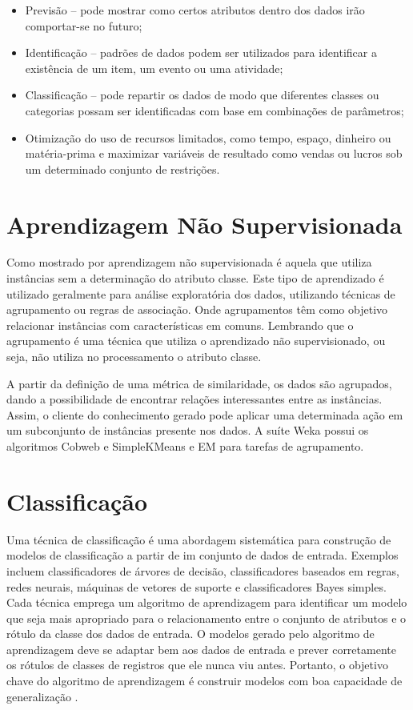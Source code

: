 \documentclass[
	12pt,				%
	openright,			%
	oneside,	
	a4paper,				%
	english,				%
	brazil				%
]{abntex2/abntex2} %
\begin{document}
		\begin{itemize}
			\item Previsão – pode mostrar como certos atributos dentro dos dados irão comportar-se no futuro;
			\item Identificação – padrões de dados podem ser utilizados para identificar a existência de um item, um evento ou uma atividade;
			\item Classificação – pode repartir os dados de modo que diferentes classes ou categorias possam ser identificadas com base em combinações de parâmetros;
			\item Otimização do uso de recursos limitados, como tempo, espaço, dinheiro ou matéria-prima e maximizar variáveis de resultado como vendas ou lucros sob um determinado conjunto de restrições.
		\end{itemize}
		
	\section{Aprendizagem Não Supervisionada}
	
		Como mostrado por \cite{damasceno:2005} aprendizagem não supervisionada é aquela que utiliza instâncias sem a determinação do atributo classe. Este  tipo de aprendizado é utilizado geralmente para análise exploratória dos dados, utilizando técnicas de  agrupamento ou regras de associação. Onde agrupamentos têm como objetivo relacionar instâncias com características em comuns. Lembrando que o agrupamento é uma técnica que utiliza o aprendizado não supervisionado, ou seja, não utiliza no  processamento o atributo classe.
		
		A partir da definição de uma métrica de similaridade, os dados são  agrupados, dando a possibilidade de encontrar relações interessantes entre as instâncias. Assim, o cliente do conhecimento gerado pode aplicar uma determinada ação em um subconjunto de instâncias presente nos  dados. A suíte Weka possui os algoritmos Cobweb e SimpleKMeans e EM para tarefas de agrupamento.
		
	\section{Classificação}
	
	Uma técnica de classificação é uma abordagem sistemática para construção de modelos de classificação a partir de im conjunto de dados de entrada. Exemplos incluem classificadores de árvores de decisão, classificadores baseados em regras, redes neurais, máquinas de vetores de suporte e classificadores Bayes simples. Cada técnica emprega um algoritmo de aprendizagem para identificar um modelo que seja mais apropriado para o relacionamento entre o conjunto de atributos e o rótulo da classe dos dados de entrada. O modelos gerado pelo algoritmo de aprendizagem deve se adaptar bem aos dados de entrada e prever corretamente os rótulos de classes de registros que ele nunca viu antes. Portanto, o objetivo chave do algoritmo de aprendizagem é construir modelos com boa capacidade de generalização \cite{tan:2009}.
	
\end{document}
